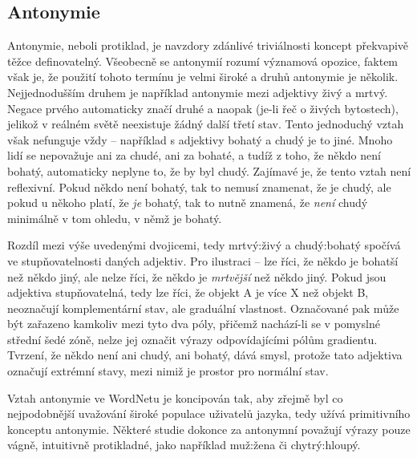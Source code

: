 \documentclass[a4paper, 11pt, oneside]{book}
\newcommand\ex{\textsf}
\begin{document}

				\subsection{Antonymie}

					Antonymie, neboli protiklad, je navzdory zdánlivé triviálnosti koncept překvapivě těžce definovatelný. Všeobecně se antonymií rozumí významová opozice, faktem však je, že použití tohoto termínu je velmi široké a druhů antonymie je několik. Nejjednodušším druhem je například antonymie mezi adjektivy \ex{živý} a \ex{mrtvý}. Negace prvého automaticky značí druhé a naopak (je-li řeč o živých bytostech), jelikož v reálném světě neexistuje žádný další třetí stav. Tento jednoduchý vztah však nefunguje vždy -- například s adjektivy \ex{bohatý} a \ex{chudý} je to jiné. Mnoho lidí se nepovažuje ani za chudé, ani za bohaté, a tudíž z toho, že někdo není bohatý, automaticky neplyne to, že by byl chudý. \parencite{miller1990introduction} Zajímavé je, že tento vztah není reflexivní. Pokud někdo není bohatý, tak to nemusí znamenat, že je chudý, ale pokud u někoho platí, že \textit{je} bohatý, tak to nutně znamená, že \textit{není} chudý minimálně v tom ohledu, v němž je bohatý. \parencite{paradis2006antonymy} 

					Rozdíl mezi výše uvedenými dvojicemi, tedy \ex{mrtvý:živý} a \ex{chudý:bohatý} spočívá ve stupňovatelnosti daných adjektiv. Pro ilustraci -- lze říci, že někdo je \ex{bohatší} než někdo jiný, ale nelze říci, že někdo je \ex{\textit{mrtvější}} než někdo jiný. Pokud jsou adjektiva stupňovatelná, tedy lze říci, že objekt A je více X než objekt B, neoznačují komplementární stav, ale graduální vlastnost. Označované pak může být zařazeno kamkoliv mezi tyto dva póly, přičemž nachází-li se v pomyslné střední šedé zóně, nelze jej označit výrazy odpovídajícími pólům gradientu. Tvrzení, že někdo \ex{není ani chudý, ani bohatý}, dává smysl, protože tato adjektiva označují extrémní stavy, mezi nimiž je prostor pro normální stav. \parencite{paradis2006antonymy} 

					Vztah antonymie ve WordNetu je koncipován tak, aby zřejmě byl co nejpodobnější uvažování široké populace uživatelů jazyka, tedy užívá primitivního konceptu antonymie. Některé studie dokonce za antonymní považují výrazy pouze vágně, intuitivně protikladné, jako například \ex{muž:žena} či \ex{chytrý:hloupý}. \parencite{lehrer1982antonymy}
\end{document}

